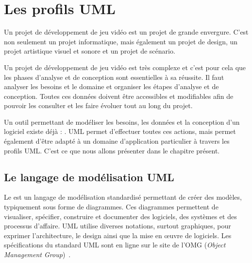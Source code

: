 \chapter{Les profils UML}
\label{chap.profils-UML}

Un projet de développement de jeu vidéo est un projet de grande envergure. C'est non seulement un projet informatique, mais également un projet de design, un projet artistique visuel et sonore et un projet de scénario.

Un projet de développement de jeu vidéo est très complexe et c'est pour cela que les phases d'analyse et de conception sont essentielles à sa réussite. Il faut analyser les besoins et le domaine et organiser les étapes d'analyse et de conception. Toutes ces données doivent être accessibles et modifiables afin de pouvoir les consulter et les faire évoluer tout au long du projet.

Un outil permettant de modéliser les besoins, les données et la conception d'un logiciel existe déjà : . UML permet d'effectuer toutes ces actions, mais permet également d'être adapté à un domaine d'application particulier à travers les profils UML. C'est ce que nous allons présenter dans le chapitre présent.


\section{Le langage de modélisation UML}

Le  est un langage de modélisation standardisé permettant de créer des mod\`eles, typiquement sous forme de diagrammes.
Ces diagrammes permettent de visualiser, spécifier, construire et documenter des logiciels, des systèmes et des processus d'affaire.
UML utilise diverses notations,  surtout graphiques, pour exprimer l'architecture, le design ainsi que la mise en \oe{}uvre de logiciels.
Les spécifications du standard UML sont en ligne sur le site de l'OMG (\emph{Object Management Group})~\cite{OMG_UML}.




